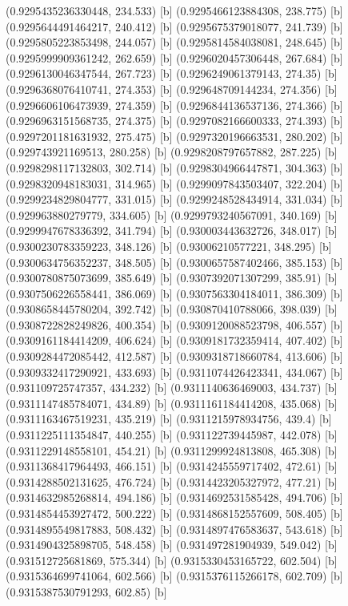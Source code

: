 {{{(0.9295435236330448, 234.533) [b] 
(0.9295466123884308, 238.775) [b] 
(0.9295644491464217, 240.412) [b] 
(0.9295675379018077, 241.739) [b] 
(0.9295805223853498, 244.057) [b] 
(0.9295814584038081, 248.645) [b] 
(0.9295999909361242, 262.659) [b] 
(0.9296020457306448, 267.684) [b] 
(0.9296130046347544, 267.723) [b] 
(0.9296249061379143, 274.35) [b] 
(0.9296368076410741, 274.353) [b] 
(0.929648709144234, 274.356) [b] 
(0.9296606106473939, 274.359) [b] 
(0.9296844136537136, 274.366) [b] 
(0.9296963151568735, 274.375) [b] 
(0.9297082166600333, 274.393) [b] 
(0.9297201181631932, 275.475) [b] 
(0.9297320196663531, 280.202) [b] 
(0.929743921169513, 280.258) [b] 
(0.9298208797657882, 287.225) [b] 
(0.9298298117132803, 302.714) [b] 
(0.9298304966447871, 304.363) [b] 
(0.9298320948183031, 314.965) [b] 
(0.9299097843503407, 322.204) [b] 
(0.9299234829804777, 331.015) [b] 
(0.9299248528434914, 331.034) [b] 
(0.929963880279779, 334.605) [b] 
(0.9299793240567091, 340.169) [b] 
(0.9299947678336392, 341.794) [b] 
(0.930003443632726, 348.017) [b] 
(0.9300230783359223, 348.126) [b] 
(0.93006210577221, 348.295) [b] 
(0.9300634756352237, 348.505) [b] 
(0.9300657587402466, 385.153) [b] 
(0.9300780875073699, 385.649) [b] 
(0.9307392071307299, 385.91) [b] 
(0.9307506226558441, 386.069) [b] 
(0.9307563304184011, 386.309) [b] 
(0.9308658445780204, 392.742) [b] 
(0.930870410788066, 398.039) [b] 
(0.9308722828249826, 400.354) [b] 
(0.9309120088523798, 406.557) [b] 
(0.9309161184414209, 406.624) [b] 
(0.9309181732359414, 407.402) [b] 
(0.9309284472085442, 412.587) [b] 
(0.9309318718660784, 413.606) [b] 
(0.9309332417290921, 433.693) [b] 
(0.9311074426423341, 434.067) [b] 
(0.931109725747357, 434.232) [b] 
(0.9311140636469003, 434.737) [b] 
(0.9311147485784071, 434.89) [b] 
(0.9311161184414208, 435.068) [b] 
(0.9311163467519231, 435.219) [b] 
(0.9311215978934756, 439.4) [b] 
(0.9311225111354847, 440.255) [b] 
(0.931122739445987, 442.078) [b] 
(0.9311229148558101, 454.21) [b] 
(0.9311299924813808, 465.308) [b] 
(0.9311368417964493, 466.151) [b] 
(0.9314245559717402, 472.61) [b] 
(0.9314288502131625, 476.724) [b] 
(0.9314423205327972, 477.21) [b] 
(0.9314632985268814, 494.186) [b] 
(0.9314692531585428, 494.706) [b] 
(0.9314854453927472, 500.222) [b] 
(0.9314868152557609, 508.405) [b] 
(0.9314895549817883, 508.432) [b] 
(0.9314897476583637, 543.618) [b] 
(0.9314904325898705, 548.458) [b] 
(0.931497281904939, 549.042) [b] 
(0.931512725681869, 575.344) [b] 
(0.9315330453165722, 602.504) [b] 
(0.9315364699741064, 602.566) [b] 
(0.9315376115266178, 602.709) [b] 
(0.9315387530791293, 602.85) [b] 
}}}
